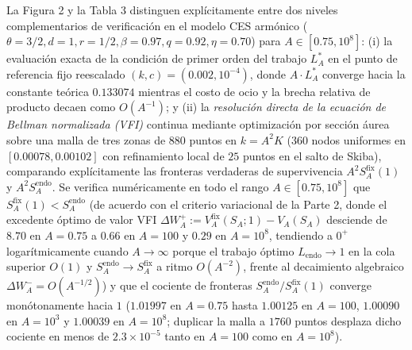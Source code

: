 \documentclass[11pt,letterpaper]{article}
\theoremstyle{plain}
\begin{document}
La Figura 2 y la Tabla 3 distinguen explícitamente entre dos niveles complementarios de verificación en el modelo CES armónico ($\theta=3/2, d=1, r=1/2, \beta=0.97, q=0.92, \eta=0.70$) para $A\in[0.75, 10^8]$: (i) la evaluación exacta de la condición de primer orden del trabajo $L^*_A$ en el punto de referencia fijo reescalado $(k,c)=(0.002, 10^{-4})$, donde $A\cdot L^*_A$ converge hacia la constante teórica $0.133074$ mientras el costo de ocio y la brecha relativa de producto decaen como $O(A^{-1})$; y (ii) la \emph{resolución directa de la ecuación de Bellman normalizada (VFI)} continua mediante optimización por sección áurea sobre una malla de tres zonas de $880$ puntos en $k=A^2 K$ ($360$ nodos uniformes en $[0.00078,0.00102]$ con refinamiento local de $25$ puntos en el salto de Skiba), comparando explícitamente las fronteras verdaderas de supervivencia $A^2 S_A^{\mathrm{fix}}(1)$ y $A^2 S_A^{\mathrm{endo}}$. Se verifica numéricamente en todo el rango $A\in[0.75, 10^8]$ que $S_A^{\mathrm{fix}}(1) < S_A^{\mathrm{endo}}$ (de acuerdo con el criterio variacional de la Parte 2, donde el excedente óptimo de valor VFI $\Delta W_A^+ := V_A^{\mathrm{fix}}(S_A; 1) - V_A(S_A)$ desciende de $8.70$ en $A=0.75$ a $0.66$ en $A=100$ y $0.29$ en $A=10^8$, tendiendo a $0^+$ logarítmicamente cuando $A\to\infty$ porque el trabajo óptimo $L_{\mathrm{endo}}\to 1$ en la cola superior $O(1)$ y $S_A^{\mathrm{endo}}\to S_A^{\mathrm{fix}}$ a ritmo $O(A^{-2})$, frente al decaimiento algebraico $\Delta W_A^- = O(A^{-1/2})$) y que el cociente de fronteras $S_A^{\mathrm{endo}}/S_A^{\mathrm{fix}}(1)$ converge monótonamente hacia $1$ ($1.01997$ en $A=0.75$ hasta $1.00125$ en $A=100$, $1.00090$ en $A=10^3$ y $1.00039$ en $A=10^8$; duplicar la malla a $1760$ puntos desplaza dicho cociente en menos de $2.3\times 10^{-5}$ tanto en $A=100$ como en $A=10^8$).
\end{document}
